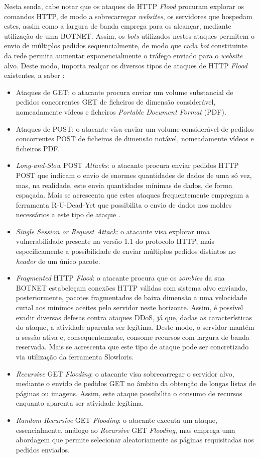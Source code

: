 Nesta senda, cabe notar que os ataques de HTTP \textit{Flood} procuram explorar os comandos HTTP, de modo a sobrecarregar \textit{websites}, os servidores que hospedam estes, assim como a largura de banda emprega para os alcançar, mediante utilização de uma BOTNET. Assim, os \textit{bots} utilizados nestes ataques permitem o envio de múltiplos pedidos sequencialmente, de modo que cada \textit{bot} constituinte da rede permita aumentar exponencialmente o tráfego enviado para o \textit{website} alvo. Deste modo, importa realçar os diversos tipos de ataques de HTTP \textit{Flood} existentes, a saber \cite{esecurityplanet_types_of_ddos_attacks}:
\begin{itemize}
    \item Ataques de GET: o atacante procura enviar um volume substancial de pedidos concorrentes GET de ficheiros de dimensão considerável, nomeadamente vídeos e ficheiros \textit{Portable Document Format} (PDF).
    \item Ataques de POST: o atacante visa enviar um volume considerável de pedidos concorrentes POST de ficheiros de dimensão notável, nomeadamente vídeos e ficheiros PDF.
    \item \textit{Long-and-Slow} POST \textit{Attacks}: o atacante procura enviar pedidos HTTP POST que indicam o envio de enormes quantidades de dados de uma só vez, mas, na realidade, este envia quantidades mínimas de dados, de forma espaçada. Mais se acrescenta que estes ataques frequentemente empregam a ferramenta R-U-Dead-Yet que possibilita o envio de dados nos moldes necessários a este tipo de ataque \cite{what_is_rudy}.
    \item \textit{Single Session or Request Attack}: o atacante visa explorar uma vulnerabilidade presente na versão 1.1 do protocolo HTTP, mais especificamente a possibilidade de enviar múltiplos pedidos distintos no \textit{header} de um único pacote.
    \item \textit{Fragmented} HTTP \textit{Flood}: o atacante procura que os \textit{zombies} da sua BOTNET estabeleçam conexões HTTP válidas com sistema alvo enviando, posteriormente, pacotes fragmentados de baixa dimensão a uma velocidade curial aos mínimos aceites pelo servidor neste horizonte. Assim, é possível evadir diversas defesas contra ataques DDoS, já que, dadas as características do ataque, a atividade aparenta ser legítima. Deste modo, o servidor mantém a sessão ativa e, consequentemente, consome recursos com largura de banda reservada. Mais se acrescenta que este tipo de ataque pode ser concretizado via utilização da ferramenta Slowloris.
    \item \textit{Recursive} GET \textit{Flooding}: o atacante visa sobrecarregar o servidor alvo, mediante o envido de pedidos GET no âmbito da obtenção de longas listas de páginas ou imagens. Assim, este ataque possibilita o consumo de recursos enquanto aparenta ser atividade legítima.
    \item \textit{Random Recursive} GET \textit{Flooding}: o atacante executa um ataque, essencialmente, análogo ao \textit{Recursive} GET \textit{Flooding}, mas emprega uma abordagem que permite selecionar aleatoriamente as páginas requisitadas nos pedidos enviados.
\end{itemize}

